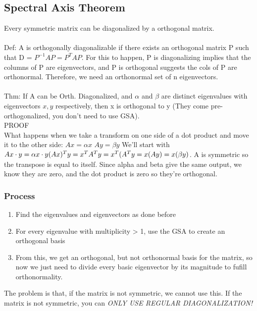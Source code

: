 \documentclass[10pt, twocolumn]{report}
\begin{document}
\subsection{Spectral Axis Theorem}
Every symmetric matrix can be diagonalized by a orthogonal matrix. \\\\ Def: A is orthogonally diagonalizable if there exists an orthogonal matrix P such that D = $P^{-1}AP = P^TAP$. For this to happen, P is diagonalizing implies that the columns of P are eigenvectors, and P is orthogonal suggests the cols of P are orthonormal. Therefore, we need an orthonormal set of n eigenvectors.\\\\ Thm: If A can be Orth. Diagonalized, and $\alpha$ and $\beta$ are distinct eigenvalues with eigenvectors $x,y$ respectively, then x is orthogonal to y (They come pre-orthogonalized, you don't need to use GSA). \\ PROOF \\ What happens when we take a transform on one side of a dot product and move it to the other side:
$Ax = \alpha x$ $Ay = \beta y$ We'll start with $Ax \cdot y \\ = \alpha x \cdot y \\ (Ax)^T y = x^T A^T y = x^T(A^T y = x(Ay) = x(\beta y)$. A is symmetric so the transpose is equal to itself. Since alpha and beta give the same output, we know they are zero, and the dot product is zero so they're orthogonal.

\subsubsection{Process}
\begin{enumerate}
	\item Find the eigenvalues and eigenvectors as done before
	\item For every eigenvalue with multiplicity > 1, use the GSA to create an orthogonal basis
	\item From this, we get an orthogonal, but not orthonormal basis for the matrix, so now we just need to divide every basic eigenvector by its magnitude to fufill orthonormality.
\end{enumerate}
The problem is that, if the matrix is not symmetric, we cannot use this. If the matrix is not symmetric, you can \textit{ONLY USE REGULAR DIAGONALIZATION!}
\end{document}
